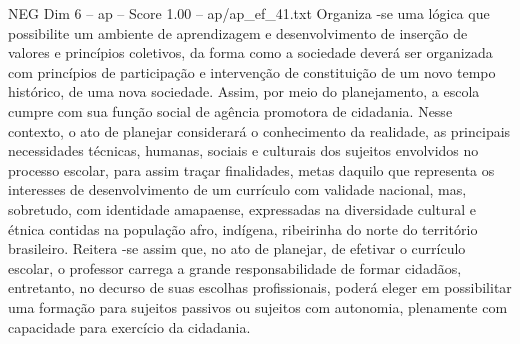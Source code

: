\begin{textsample}{NEG Dim 6 – ap – Score 1.00 – ap/ap\_ef\_41.txt}
Organiza -se uma lógica que possibilite um ambiente de aprendizagem e desenvolvimento de inserção de valores e princípios coletivos, da forma como a sociedade deverá ser organizada com princípios de participação e intervenção de constituição de um novo tempo histórico, de uma nova sociedade.
Assim, por meio do planejamento, a escola cumpre com sua função social de agência promotora de cidadania.
Nesse contexto, o ato de planejar considerará o conhecimento da realidade, as principais necessidades técnicas, humanas, sociais e culturais dos sujeitos envolvidos no processo escolar, para assim traçar finalidades, metas daquilo que representa os interesses de desenvolvimento de um currículo com validade nacional, mas, sobretudo, com identidade amapaense, expressadas na diversidade cultural e étnica contidas na população afro, indígena, ribeirinha do norte do território brasileiro.
Reitera -se assim que, no ato de planejar, de efetivar o currículo escolar, o professor carrega a grande responsabilidade de formar cidadãos, entretanto, no decurso de suas escolhas profissionais, poderá eleger em possibilitar uma formação para sujeitos passivos ou sujeitos com autonomia, plenamente com capacidade para exercício da cidadania.

\end{textsample}
